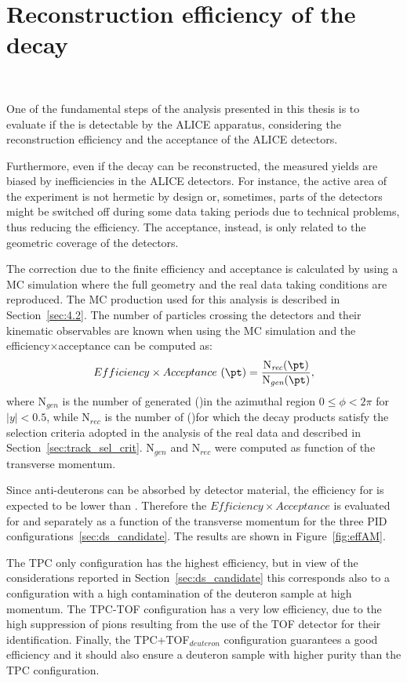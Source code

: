 %
%
\section{Reconstruction efficiency of the \ds decay}~\label{sec:eff}

One of the fundamental steps of the analysis presented in this thesis is to evaluate if the
\dstdecay is detectable by the ALICE apparatus, considering the reconstruction efficiency and the acceptance
of the ALICE detectors. 

Furthermore, even if the decay can be reconstructed, the measured yields are biased by
inefficiencies in the ALICE detectors.
For instance, the active area of the experiment is not hermetic by design or, sometimes, parts of
the detectors might be switched off during some data taking periods due to technical problems,
thus reducing the efficiency.
The acceptance, instead, is only related to the geometric coverage of the detectors.

The correction due to the finite efficiency and acceptance is calculated by using a MC simulation where the
full geometry and the real data taking conditions are reproduced. The MC production used for this
analysis is described in Section~\ref{sec:4.2}. 
The number of particles crossing the detectors and their kinematic observables are known when using
the MC simulation and the efficiency$\times$acceptance can be computed as:
\begin{equation}
    Efficiency \times Acceptance\ (\pt) = \frac{\mathrm{N}_{\textit{rec}}(\pt)}
    {\mathrm{N}_{\textit{gen}}(\pt)},
\end{equation}
where $\mathrm{N}_{\textit{gen}}$ is the number of generated (\dsbar)\ds in the azimuthal region
$0 \leq \phi < 2\pi$ for $|y| < 0.5$, while $\mathrm{N}_{\textit{rec}}$ is the number of 
(\dsbar)\ds for which the decay products satisfy the selection criteria adopted in the analysis 
of the real data and described in Section~\ref{sec:track_sel_crit}.
$\mathrm{N}_{\textit{gen}}$ and $\mathrm{N}_{\textit{rec}}$ were computed as function of the transverse 
momentum.

Since anti-deuterons can be absorbed by detector material, the efficiency for \dsbar is
expected to be lower than \ds.
Therefore the $Efficiency \times Acceptance$ is evaluated for \ds and \dsbar separately as a
function of the transverse momentum for the three PID configurations~\ref{sec:ds_candidate}. 
The results are shown in Figure~\ref{fig:effAM}.

The TPC only configuration has the highest efficiency,
but in view of the considerations reported in Section~\ref{sec:ds_candidate} this corresponds 
also to a configuration with a high contamination of the deuteron sample at high momentum.
The TPC-TOF configuration has a very low efficiency, due to the high suppression of pions
resulting from the use of the TOF detector for their identification. 
Finally, the TPC+TOF$_{deuteron}$ configuration guarantees a good efficiency and it should 
also ensure a deuteron sample with higher purity than the TPC configuration.

